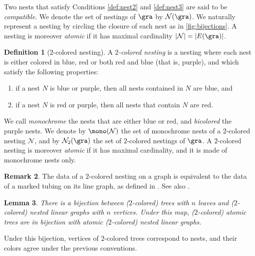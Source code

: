 \documentclass[JEP,XML,SOM,NoFloatCountersInSection,Unicode,published]{cedram}
\theoremstyle{definition}
\newtheorem{definition}{Definition}[section]
\newtheorem{remark}[definition]{\sc Remark}
\theoremstyle{plain}
\newtheorem{lemma}[definition]{Lemma}
\begin{document}
Two nests that satisfy Conditions \eqref{def:nest2} and \eqref{def:nest3} are said to be \textit{compatible}.
We denote the set of nestings of $\gra$ by $\mathcal{N}(\gra)$.
We naturally represent a nesting by circling the closure of each nest as in \cref{fig:bijections}.
A nesting is moreover \emph{atomic} if it has maximal cardinality $|\mathcal{N}|=|E(\gra)|$.

\begin{definition}[$2$-colored nesting]
A \emph{$2$-colored nesting} is a nesting where each nest is either colored in blue, red or both red and blue (that is, purple), and which satisfy the following properties:
\begin{enumerate}
\item if a nest $N$ is blue or purple, then all nests contained in $N$ are blue, and
\item if a nest $N$ is red or purple, then all nests that contain $N$ are red.
\end{enumerate}
\end{definition}
We call \emph{monochrome} the nests that are either blue or red, and \emph{bicolored} the purple nests.
We denote by $\mono(\mathcal{N})$ the set of monochrome nests of a $2$-colored nesting $\mathcal{N}$, and by $\mathcal{N}_2(\gra)$ the set of $2$-colored nestings of $\gra$.
A $2$-colored nesting is moreover \emph{atomic} if it has maximal cardinality, and it is made of monochrome nests only.

\begin{remark}
The data of a $2$-colored nesting on a graph is equivalent to the data of a marked tubing on its line graph, as defined in \cite{DevadossForcey08}. See also \cite[Rem.\,2.4]{LA21}.
\end{remark}

\begin{lemma}
\label{lemma:bijection}
There is a bijection between ($2$-colored) trees with $n$ leaves and ($2$\nobreakdash-colored) nested linear graphs with $n$ vertices.
Under this map, ($2$-colored) atomic trees are in bijection with atomic ($2$-colored) nested linear graphs.
\end{lemma}

Under this bijection, vertices of $2$-colored trees correspond to nests, and their colors agree under the previous conventions.
\end{document}

